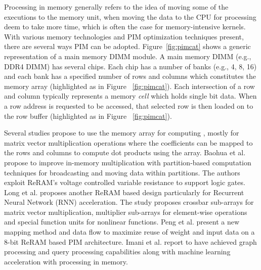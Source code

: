




Processing in memory generally refers to the idea of moving some of the executions to the memory unit, when moving the data to the CPU for processing deem to take more time, which is often the case for memory-intensive kernels. With various memory technologies and PIM optimization techniques present, there are several ways PIM can be adopted. Figure~\ref{fig:pimcat} shows a generic representation of a main memory DIMM module. A main memory DIMM (e.g., DDR4 DIMM) has several chips. Each chip has a number of banks (e.g., 4, 8, 16) and each bank has a specified number of rows and columns which constitutes the memory array (highlighted as  in Figure ~\ref{fig:pimcat}). Each intersection of a row and column typically represents a memory \textit{cell} which holds single bit data. When a row address is requested to be accessed, that selected row is then loaded on to the row buffer (highlighted as  in Figure ~\ref{fig:pimcat}). 



Several studies propose to use the memory array  for computing \cite{03,06,13,15,20,29}, mostly for matrix vector multiplication operations where the coefficients can be mapped to the rows and columns to compute dot products using the array. Baohua et al. \cite{13} propose to improve in-memory multiplication with partition-based computation techniques for broadcasting and moving data within partitions. The authors exploit ReRAM's voltage controlled variable resistance to support logic gates. Long et al. \cite{20} proposes another ReRAM based design particularly for Recurrent Neural Network (RNN) acceleration. The study proposes crossbar sub-arrays for matrix vector multiplication, multiplier sub-arrays for element-wise operations and special function units for nonlinear functions. Peng et al. \cite{15} present a new mapping method and data flow to maximize reuse of weight and input data on a 8-bit ReRAM based PIM architecture. Imani et al. \cite{06} report to have achieved graph processing and query processing capabilities along with machine learning acceleration with processing in memory.  




